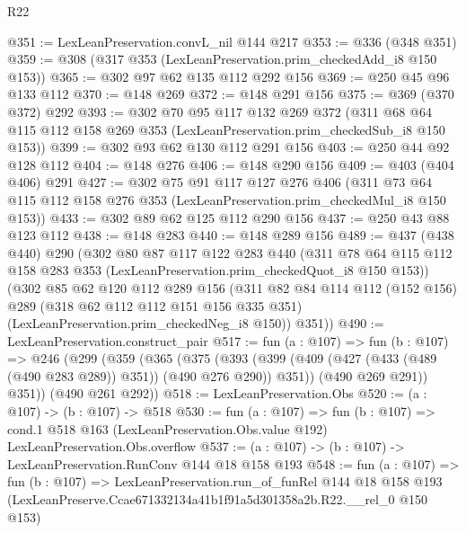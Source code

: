 \begin{lexlean}{R22}
\begin{coremodule}
@351 := LexLeanPreservation.convL_nil @144 @217
@353 := @336 (@348 @351)
@359 := @308 (@317 @353 (LexLeanPreservation.prim_checkedAdd_i8 @150 @153))
@365 := @302 @97 @62 @135 @112 @292 @156
@369 := @250 @45 @96 @133 @112
@370 := @148 @269
@372 := @148 @291 @156
@375 := @369 (@370 @372) @292
@393 := @302
    @70
    @95
    @117
    @132
    @269
    @372
    (@311 @68 @64 @115 @112 @158 @269 @353 (LexLeanPreservation.prim_checkedSub_i8 @150 @153))
@399 := @302 @93 @62 @130 @112 @291 @156
@403 := @250 @44 @92 @128 @112
@404 := @148 @276
@406 := @148 @290 @156
@409 := @403 (@404 @406) @291
@427 := @302
    @75
    @91
    @117
    @127
    @276
    @406
    (@311 @73 @64 @115 @112 @158 @276 @353 (LexLeanPreservation.prim_checkedMul_i8 @150 @153))
@433 := @302 @89 @62 @125 @112 @290 @156
@437 := @250 @43 @88 @123 @112
@438 := @148 @283
@440 := @148 @289 @156
@489 := @437
    (@438 @440)
    @290
    (@302
      @80
      @87
      @117
      @122
      @283
      @440
      (@311 @78 @64 @115 @112 @158 @283 @353 (LexLeanPreservation.prim_checkedQuot_i8 @150 @153))
      (@302
        @85
        @62
        @120
        @112
        @289
        @156
        (@311
          @82
          @84
          @114
          @112
          (@152 @156)
          @289
          (@318 @62 @112 @112 @151 @156 @335 @351)
          (LexLeanPreservation.prim_checkedNeg_i8 @150))
        @351))
@490 := LexLeanPreservation.construct_pair
@517 := fun (a : @107) =>
  fun (b : @107) =>
  @246
    (@299
      (@359
        (@365
          (@375
            (@393 (@399 (@409 (@427 (@433 (@489 (@490 @283 @289)) @351)) (@490 @276 @290)) @351))
            (@490 @269 @291))
          @351))
      (@490 @261 @292))
@518 := LexLeanPreservation.Obs
@520 := (a : @107) -> (b : @107) -> @518
@530 := fun (a : @107) =>
  fun (b : @107) =>
  cond.{1} @518 @163 (LexLeanPreservation.Obs.value @192) LexLeanPreservation.Obs.overflow
@537 := (a : @107) -> (b : @107) -> LexLeanPreservation.RunConv @144 @18 @158 @193
@548 := fun (a : @107) =>
  fun (b : @107) =>
  LexLeanPreservation.run_of_funRel
    @144
    @18
    @158
    @193
    (LexLeanPreserve.Ccae671332134a41b1f91a5d301358a2b.R22.__rel_0 @150 @153)
\end{coremodule}
\end{lexlean}

